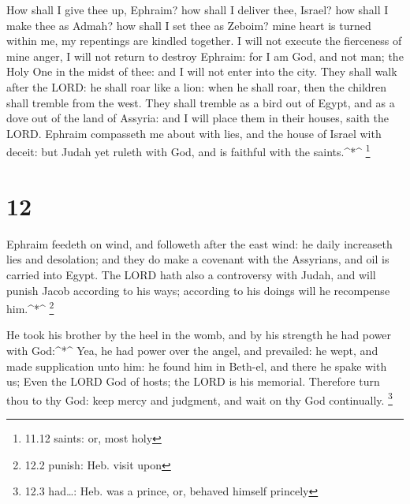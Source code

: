  How shall I give thee up, Ephraim? how shall I deliver
thee, Israel? how shall I make thee as Admah? how shall I set thee as
Zeboim? mine heart is turned within me, my repentings are kindled
together.  I will not execute the fierceness of mine anger,
I will not return to destroy Ephraim: for I am God, and not man; the
Holy One in the midst of thee: and I will not enter into the city.
 They shall walk after the LORD: he shall roar like a lion:
when he shall roar, then the children shall tremble from the west.
 They shall tremble as a bird out of Egypt, and as a dove
out of the land of Assyria: and I will place them in their houses, saith
the LORD.  Ephraim compasseth me about with lies, and the
house of Israel with deceit: but Judah yet ruleth with God, and is
faithful with the saints.\^{}*\^{} \footnote{11.12 saints: or, most holy}

\hypertarget{section-11}{%
\section{12}\label{section-11}}

 Ephraim feedeth on wind, and followeth after the east wind:
he daily increaseth lies and desolation; and they do make a covenant
with the Assyrians, and oil is carried into Egypt.  The LORD
hath also a controversy with Judah, and will punish Jacob according to
his ways; according to his doings will he recompense him.\^{}*\^{}
\footnote{12.2 punish: Heb. visit upon}

 He took his brother by the heel in the womb, and by his
strength he had power with God:\^{}*\^{}  Yea, he had power
over the angel, and prevailed: he wept, and made supplication unto him:
he found him in Beth-el, and there he spake with us;  Even
the LORD God of hosts; the LORD is his memorial.  Therefore
turn thou to thy God: keep mercy and judgment, and wait on thy God
continually. \footnote{12.3 had\ldots: Heb. was a prince, or, behaved
  himself princely}

